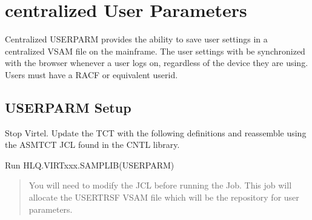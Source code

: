 \documentclass[letterpaper,10pt,english]{sphinxmanual}
\begin{document}
\ignorespaces 

\chapter{centralized User Parameters}
\label{\detokenize{Customization:centralized-user-parameters}}\label{\detokenize{Customization:index-95}}
\sphinxAtStartPar
Centralized USERPARM provides the ability to save user settings in a centralized VSAM file on the mainframe. The user settings with be synchronized with the browser whenever a user logs on, regardless of the device they are using. Users must have a RACF or equivalent userid.


\section{USERPARM Setup}
\label{\detokenize{Customization:userparm-setup}}
   Stop Virtel. Update the TCT with the following definitions and re\sphinxhyphen{}assemble using the ASMTCT JCL found in the CNTL library.
\begin{quote}

\begin{sphinxVerbatim}[commandchars=\\\{\}]
                                              
                                
            
\end{sphinxVerbatim}
\end{quote}

   Run HLQ.VIRTxxx.SAMPLIB(USERPARM)
\begin{quote}

\sphinxAtStartPar
You will need to modify the JCL before running the Job. This job will allocate the USERTRSF VSAM file which will be the repository for user parameters.
\end{quote}
\end{document}
